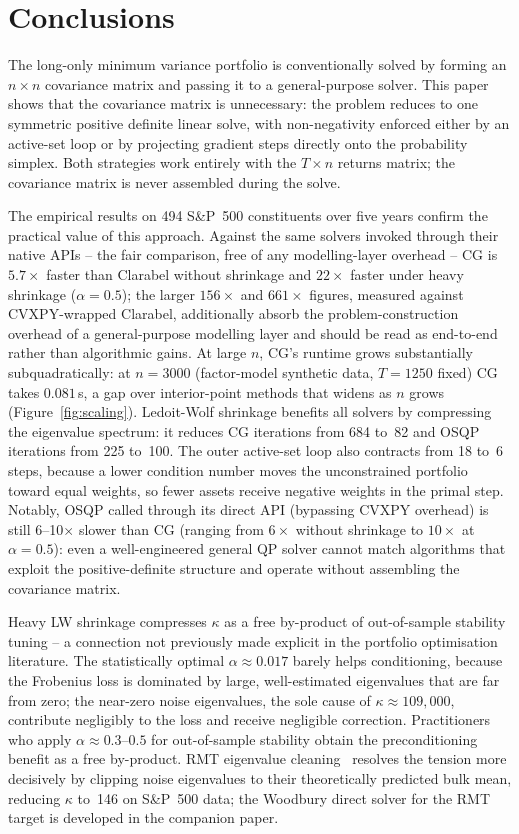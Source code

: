 \section{Conclusions}

The long-only minimum variance portfolio is conventionally solved by forming an $n\times n$
covariance matrix and passing it to a general-purpose solver. This paper shows that the
covariance matrix is unnecessary: the problem reduces to one symmetric positive definite
linear solve, with non-negativity enforced either by an active-set loop or by projecting
gradient steps directly onto the probability simplex. Both strategies work entirely with
the $T\times n$ returns matrix; the covariance matrix is never assembled during
the solve.

The empirical results on 494 S\&P~500 constituents over five years confirm the practical
value of this approach. Against the same solvers invoked through their native APIs --
the fair comparison, free of any modelling-layer overhead -- CG is $5.7\times$ faster than
Clarabel without shrinkage and $22\times$ faster under heavy shrinkage ($\alpha=0.5$); the
larger $156\times$ and $661\times$ figures, measured against CVXPY-wrapped Clarabel, additionally
absorb the problem-construction overhead of a general-purpose modelling layer and should be
read as end-to-end rather than algorithmic gains. At large $n$, CG's runtime
grows substantially subquadratically: at $n=3000$ (factor-model synthetic data, $T=1250$ fixed)
CG takes $0.081$\,s, a gap over interior-point methods that widens as $n$ grows
(Figure~\ref{fig:scaling}). Ledoit-Wolf shrinkage benefits all solvers by compressing the
eigenvalue spectrum: it reduces CG iterations from 684 to~82 and OSQP iterations from 225 to~100.
The outer active-set loop also contracts from 18 to~6 steps, because a lower condition number
moves the unconstrained portfolio toward equal weights, so fewer assets receive negative weights
in the primal step. Notably, OSQP called through its direct API
(bypassing CVXPY overhead) is still 6--10$\times$ slower than CG (ranging from $6\times$ without shrinkage to $10\times$ at $\alpha=0.5$):
even a well-engineered general QP solver cannot match algorithms that exploit the
positive-definite structure and operate without assembling the covariance matrix.

Heavy LW shrinkage compresses $\kappa$ as a free by-product of out-of-sample stability
tuning -- a connection not previously made explicit in the portfolio optimisation literature.
The statistically optimal $\alpha \approx 0.017$ barely helps conditioning, because the
Frobenius loss is dominated by large, well-estimated eigenvalues that are far from zero;
the near-zero noise eigenvalues, the sole cause of $\kappa \approx 109{,}000$, contribute
negligibly to the loss and receive negligible correction. Practitioners who apply
$\alpha \approx 0.3$--$0.5$ for out-of-sample stability obtain the preconditioning benefit
as a free by-product. RMT eigenvalue cleaning~\cite{schmelzer2026rmt} resolves the
tension more decisively by clipping noise eigenvalues to their theoretically predicted
bulk mean, reducing $\kappa$ to~146 on S\&P~500 data; the Woodbury direct solver for the
RMT target is developed in the companion paper.

